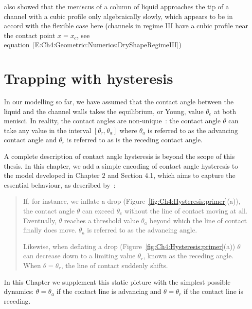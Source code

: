 \cite{Gorce2016Langmuir} also showed that  the meniscus of a column of liquid approaches the tip of a channel with a cubic profile only algebraically slowly, which appears to be in accord with the flexible case here (channels in regime III have a cubic profile near the contact point $x = x_c$, see equation~\eqref{E:Ch4:Geometric:Numerics:DryShapeRegimeIII})


\section{Trapping with hysteresis}
%
\newcommand{\hyspar}{\lambda}
\newcommand{\hysparmax}{\hyspar_{\text{max}} }
\newcommand{\hyspare}{\lambda_e}
\newcommand{\hyspari}{\lambda_{\infty}}
\newcommand{\xlefteq}{X_{-}}
\newcommand{\xrighteq}{X_{+}}
\newcommand{\xceq}{X_{c}} %
\newcommand{\xpmeq}{X_{\pm}} %

In our modelling so far, we have assumed that the contact angle between the liquid and the channel walls takes the equilibrium, or Young, value $\theta_e$ at both menisci. In reality, the contact angles are non-unique~\citep{deGennes2004}: the contact angle $\theta$ can take any value in the interval $[\theta_r, \theta_a]$ where $\theta_a$ is referred to as the advancing contact angle and $\theta_r$ is referred to as is the receding contact angle.

A complete description of contact angle hysteresis is beyond the scope of this thesis. In this chapter, we add a simple encoding of contact angle hysteresis to the model developed in Chapter 2 and Section 4.1, which aims to capture the essential behaviour, as described by~\cite{deGennes2004}:
\begin{quote}
If, for instance, we inflate a drop (Figure~\ref{fig:Ch4:Hysteresis:primer}(a)), the contact angle $\theta$ can exceed $\theta_e$ without the line of contact moving at all. Eventually, $\theta$ reaches a threshold value $\theta_a$ beyond which the line of contact finally does move. $\theta_a$ is referred to as the advancing angle.

Likewise, when deflating a drop (Figure~\ref{fig:Ch4:Hysteresis:primer}(a)) $\theta$ can decrease down to a limiting value $\theta_r$, known as the receding angle. When $\theta = \theta_r$, the line of contact suddenly shifts.
\end{quote}
In this Chapter we supplement this static picture with the simplest possible dynamics: $\theta = \theta_a$ if the contact line is advancing and $\theta  = \theta_r$ if the contact line is receding.

